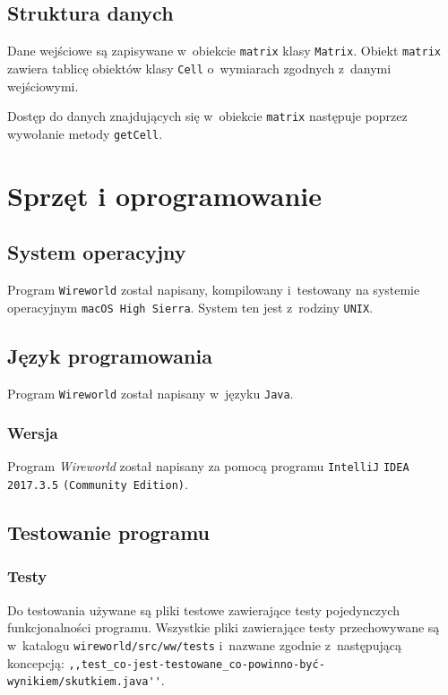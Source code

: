 \documentclass[a4paper,12pt,oneside]{article}
\begin{document}
\subsection{Struktura danych}

Dane wejściowe są zapisywane w~obiekcie \verb+matrix+ klasy \verb+Matrix+. Obiekt \verb+matrix+ zawiera tablicę obiektów klasy \verb+Cell+ o~wymiarach zgodnych z~danymi wejściowymi.
\par Dostęp do danych znajdujących się w~obiekcie \verb+matrix+ następuje poprzez wywołanie metody \verb+getCell+.

\section{Sprzęt i oprogramowanie}

\subsection{System operacyjny}
Program \verb+Wireworld+ został napisany, kompilowany i~testowany na systemie operacyjnym \verb+macOS High Sierra+. System ten jest z~rodziny \verb+UNIX+.

\subsection{Język programowania}
Program \verb+Wireworld+ został napisany w~języku \verb+Java+.

\subsubsection{Wersja}
Program \textit{Wireworld} został napisany za pomocą programu \verb+IntelliJ+ \verb+IDEA 2017.3.5+ \verb+(Community Edition)+.

\subsection{Testowanie programu}

\subsubsection{Testy}
Do testowania używane są pliki testowe zawierające testy pojedynczych funkcjonalności programu. Wszystkie pliki zawierające testy przechowywane są w~katalogu \verb+wireworld/src/ww/tests+ i~nazwane zgodnie z~następującą koncepcją: \verb+,,test_co-jest-testowane_co-powinno-być-wynikiem/skutkiem.java''+.
\end{document}
